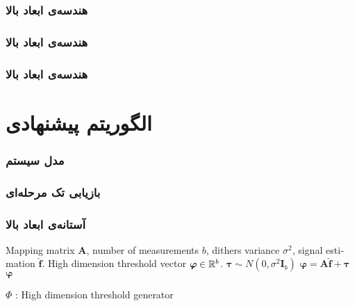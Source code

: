 \begin{frame}
\frametitle{هندسه‌ی ابعاد بالا}

\end{frame}

\begin{frame}
\frametitle{هندسه‌ی ابعاد بالا}
\framesubtitle{}

\end{frame}

\begin{frame}
\frametitle{هندسه‌ی ابعاد بالا}
\framesubtitle{}
\end{frame}


\section{الگوریتم پیشنهادی\hfill}

\begin{frame}
\frametitle{مدل سیستم}

\begin{figure}
	\centering
	
\end{figure}

\end{frame}

\begin{frame}
\frametitle{بازیابی تک مرحله‌ای}

\end{frame}

\begin{frame}
\frametitle{آستانه‌ی ابعاد بالا}
\begin{latin}
\begin{algorithm}[H]
\begin{algorithmic}[1]
\renewcommand{\algorithmicrequire}{\textbf{Input:}}
\renewcommand{\algorithmicensure}{\textbf{Output:}}
\REQUIRE Mapping matrix $ \bm{A} $, number of measurements $ b $, dithers variance $ \sigma^{2} $, signal estimation $ \hat{\bm{f}} $.
\ENSURE High dimension threshold vector $\bm{\varphi}\in \mathbb{R}^{b}$.
\STATE $ \bm{\tau}\sim N(0,\sigma^{2}\bm{I}_{b} ) $
\STATE  $ \bm{\varphi}=\bm{A}\hat{\bm{f}}+\bm{\tau} $
\RETURN $ \bm{\varphi} $
\end{algorithmic} 
\caption{ $\Phi$ : High dimension threshold generator}
\label{alg:HDTG}
\end{algorithm}
\end{latin}
\end{frame}


